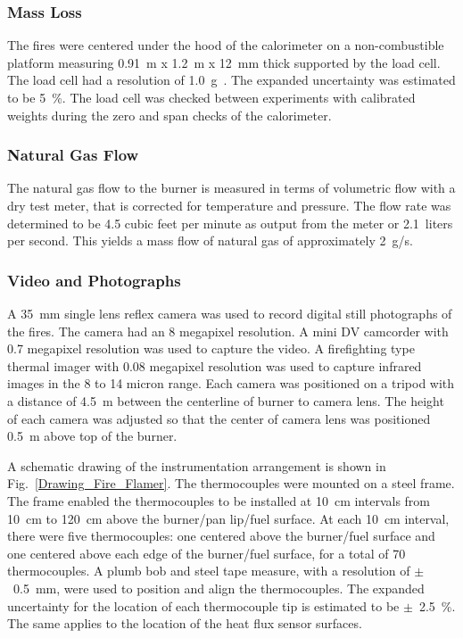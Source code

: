 \documentclass[twoside]{uocthesis}
\begin{document}
{\subsubsection{Mass Loss}

The fires were centered under the hood of the calorimeter on a non-combustible platform measuring 0.91~m x 1.2~m x 12~mm thick supported by the load cell.  The load cell had a resolution of 1.0~g~\cite{Mettler}. The expanded uncertainty was estimated to be 5~\%.  The load cell was checked between experiments with calibrated weights during the zero and span checks of the calorimeter.

\subsubsection{Natural Gas Flow}

The natural gas flow to the burner is measured in terms of volumetric flow with a dry test meter, that is corrected for temperature and pressure. The flow rate was determined to be 4.5 cubic feet per minute as output from the meter or 2.1~liters per second.  This yields a mass flow of natural gas of approximately 2~g/s.  

\subsubsection{Video and Photographs}

A 35~mm single lens reflex camera was used to record digital still photographs of the fires.  The camera had an 8 megapixel resolution.  A mini DV camcorder with 0.7 megapixel resolution was used to capture the video.  A firefighting type thermal imager with 0.08 megapixel resolution was used to capture infrared images in the 8 to 14 micron range.  Each camera was positioned on a tripod with a distance of 4.5~m between the centerline of burner to camera lens.  The height of each camera was adjusted so that the center of camera lens was positioned 0.5~m above top of the burner.

A schematic drawing of the instrumentation arrangement is shown in Fig.~\ref{Drawing_Fire_Flamer}.  The thermocouples were mounted on a steel frame.  The frame enabled the thermocouples to be installed at 10~cm intervals from 10~cm to 120~cm above the burner/pan lip/fuel surface. At each 10~cm interval, there were five thermocouples: one centered above the burner/fuel surface and one centered above each edge of the burner/fuel surface, for a total of 70 thermocouples.  A plumb bob and steel tape measure, with a resolution of $\pm$~0.5~mm, were used to position and align the thermocouples.   The expanded uncertainty for the location of each thermocouple tip is estimated to be $\pm$~2.5~\%.  The same applies to the location of the heat flux sensor surfaces.

}
\end{document}
